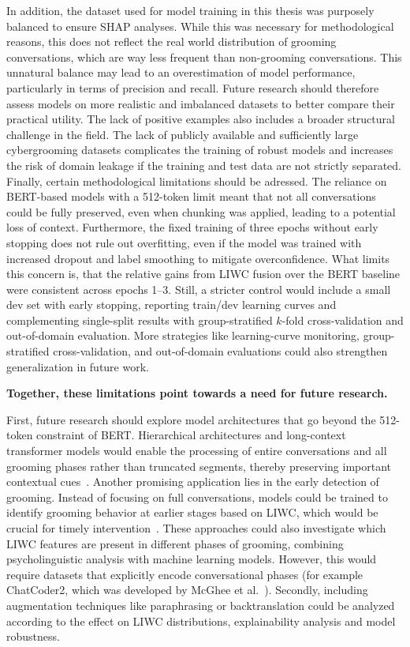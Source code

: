 In addition, the dataset used for model training in this thesis was purposely balanced to ensure SHAP analyses. While this was necessary for methodological reasons, this does not reflect the real world distribution of grooming conversations, which are way less frequent than non-grooming conversations. This unnatural balance may lead to an overestimation of model performance, particularly in terms of precision and recall. Future research should therefore assess models on more realistic and imbalanced datasets to better compare their practical utility. The lack of positive examples also includes a broader structural challenge in the field. The lack of publicly available and sufficiently large cybergrooming datasets complicates the training of robust models and increases the risk of domain leakage if the training and test data are not strictly separated.  
Finally, certain methodological limitations should be adressed. The reliance on BERT-based models with a 512-token limit meant that not all conversations could be fully preserved, even when chunking was applied, leading to a potential loss of context. Furthermore, the fixed training of three epochs without early stopping does not rule out overfitting, even if the model was trained with increased dropout and label smoothing to mitigate overconfidence. What limits this concern is, that the relative gains from LIWC fusion over the BERT baseline were consistent across epochs 1–3. Still, a stricter control would include a small dev set with early stopping, reporting train/dev learning curves and complementing single-split results with group-stratified $k$-fold cross-validation and out-of-domain evaluation. More strategies like learning-curve monitoring, group-stratified cross-validation, and out-of-domain evaluations could also strengthen generalization in future work.  

\textbf{Together, these limitations point towards a need for future research.}

First, future research should explore model architectures that go beyond the 512-token constraint of BERT. Hierarchical architectures and long-context transformer models would enable the processing of entire conversations and all grooming phases rather than truncated segments, thereby preserving important contextual cues~\cite{vogt2021early}. Another promising application lies in the early detection of grooming. Instead of focusing on full conversations, models could be trained to identify grooming behavior at earlier stages based on LIWC, which would be crucial for timely intervention~\cite{vogt2021early}. These approaches could also investigate which LIWC features are present in different phases of grooming, combining psycholinguistic analysis with machine learning models. However, this would require datasets that explicitly encode conversational phases (for example ChatCoder2, which was developed by McGhee et al.~\cite{chatcoder}). 
Secondly, including augmentation techniques like paraphrasing or backtranslation could be analyzed according to the effect on LIWC distributions, explainability analysis and model robustness. 

